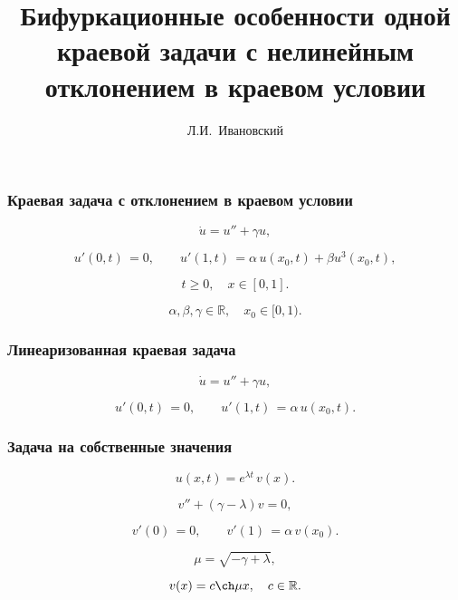 \documentclass[fullscreen=true, unicode, bookmarks=false]{beamer}
\title[]{ {\huge Бифуркационные особенности одной краевой задачи с нелинейным отклонением в краевом условии } }
\author[]{{\large Л.И.~Ивановский}}
\date{ }
\institute[]
{ ЯрГУ им. П.Г. Демидова }
\begin{document}
\begin{frame}
\titlepage
\end{frame} 

\begin{frame}
\frametitle{ Краевая задача с отклонением в краевом условии }
 
\begin{equation}
	\dot u = u'' + \gamma u,	
\end{equation}

\begin{equation}
	u'(0, t) \, = 0, \qquad u'(1, t) \, = \alpha\,u(x_0, t) + \beta u^3(x_0, t),
\end{equation}

\bigskip

$$ t \geqslant 0, \quad x \in [0,1]. $$


$$ \alpha, \beta, \gamma \in \mathbb{R}, \quad x_0 \in [0, 1). $$

\end{frame}

\begin{frame}
\frametitle{ Линеаризованная краевая задача }
 
\begin{equation}
	\dot u = u'' + \gamma u,	
\end{equation}

\begin{equation}	
	u'(0, t) \, = 0, \qquad u'(1, t) \, = \alpha\,u(x_0, t).
\end{equation}

\end{frame}

\begin{frame}
\frametitle{ Задача на собственные значения }
 
$$ u(x, t) = e^{\lambda t} \, v(x). $$

\bigskip
 
\begin{equation}
	v'' + (\gamma - \lambda)v = 0,	
\end{equation}

\begin{equation}	
	v'(0) \, = 0, \qquad v'(1) \, = \alpha\,v(x_0).
\end{equation}

\bigskip

$$ \mu = \sqrt{-\gamma + \lambda}, $$

$$ v(x) = c \ch  \mu x, \quad c \in \mathbb{R}. $$

\end{frame}
\end{document}
